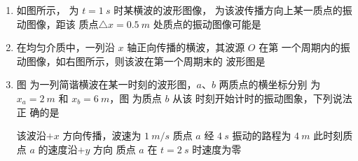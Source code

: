 \begin{enumerate}
\item 
{}
如图所示，  为 $ t=1 \ s $ 时某横波的波形图像，  为该波传播方向上某一质点的振动图像，距该
质点$ \triangle x=0.5 \ m $ 处质点的振动图像可能是  
\begin{figure}[h!]
	\centering
\begin{subfigure}{0.4\linewidth}
	\centering
	 
	\caption{}\label{2014四川05a}
\end{subfigure}
\begin{subfigure}{0.4\linewidth}
	\centering
	 
	\caption{}\label{2014四川05b}
\end{subfigure}
\end{figure}

\pfourchoices
{}
{}
{}
{}


\item 
{}
在均匀介质中，一列沿 $ x $ 轴正向传播的横波，其波源 $ O $ 在第
一个周期内的振动图像，如右图所示，则该波在第一个周期末的
波形图是  
\begin{figure}[h!]
	\centering
	
\end{figure}

\pfourchoices
{}
{}
{}
{}


\item 
{}
图  为一列简谐横波在某一时刻的波形图，$ a $、$ b $ 两质点的横坐标分别
为 $ x_a=2 \ m $ 和 $ x_b=6 \ m $，图  为质点 $ b $ 从该
时刻开始计时的振动图象，下列说法正
确的是  
\begin{figure}[h!]
	\centering
\begin{subfigure}{0.4\linewidth}
	\centering
	 
	\caption{}\label{2015天津11a}
\end{subfigure}
\begin{subfigure}{0.4\linewidth}
	\centering
	 
	\caption{}\label{2015天津11b}
\end{subfigure}
\end{figure}


\fourchoices
{该波沿$ +x $ 方向传播，波速为 $ 1 \ m /s $}
{质点 $ a $ 经 $ 4 \ s $ 振动的路程为 $ 4 \ m $}
{此时刻质点 $ a $ 的速度沿$ +y $ 方向}
{质点 $ a $ 在 $ t=2 \ s $ 时速度为零}


	
	
\end{enumerate}

